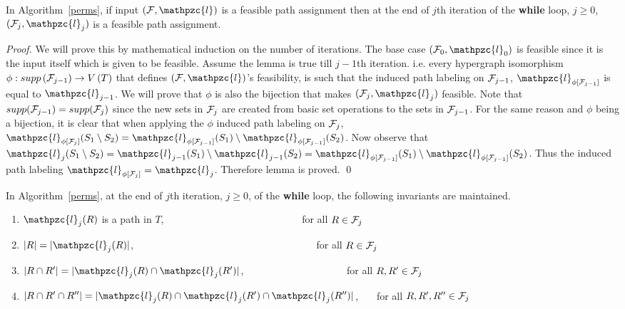 \documentclass[11pt,
               envcountsect,
               envcountsame]
               {../lib/llncs2e/llncs}
\def\cF{{\cal F}}
\def\cl{\mathpzc{l}}
\def\topshrink{0mm} %
\begin{document}
\begin{lemma} 
 \label{lem:feasible} 
 In Algorithm~\ref{perms}, if input $(\cF, \cl)$ is a feasible path
 assignment then at the end of $j$th iteration of the {\bf while}
 loop, $j \ge 0$, $(\cF_j, \cl_j)$ is a feasible path assignment.
\end{lemma}
\begin{proof}%
  We will prove this by mathematical induction on the number of
  iterations. The base case $(\cF_0, \cl_0)$ is feasible since it is
  the input itself which is given to be feasible. Assume the lemma is
  true till $j-1$th iteration. i.e. every hypergraph isomorphism
  $\phi: supp\left(\cF_{j-1}\right) \rightarrow V\left(T \right)$ that
  defines $(\cF, \cl)$'s feasibility, is such that the induced path
  labeling on $\cF_{j-1}$, $\cl_{\phi[{\cF_{j-1}}]}$ is equal to
  $\cl_{j-1}$. We will prove that $\phi$ is also the bijection that
  makes $(\cF_j, \cl_j)$ feasible. Note that $supp(\cF_{j-1}) =
  supp(\cF_{j})$ since the new sets in $\cF_j$ are created from basic
  set operations to the sets in $\cF_{j-1}$. For the same reason and
  $\phi$ being a bijection, it is clear that when applying the $\phi$
  induced path labeling on $\cF_j$, $ \cl_{\phi[{\cF_{j}}]}(S_1
  \setminus S_2) = \cl_{\phi[{\cF_{j-1}}]}(S_1) \setminus
  \cl_{\phi[{\cF_{j-1}}]}(S_2)$. Now observe that $ \cl_j(S_1
  \setminus S_2) = \cl_{j-1}(S_1) \setminus \cl_{j-1}(S_2) =
  \cl_{\phi[{\cF_{j-1}}]}(S_1) \setminus
  \cl_{\phi[{\cF_{j-1}}]}(S_2)$. Thus the induced path labeling
  $\cl_{\phi[{\cF_{j}}]} = \cl_{j}$. Therefore lemma is proved.  \qed
\end{proof}

\begin{lemma}
  \label{lem:invar1} In Algorithm~\ref{perms}, at the end of $j$th
  iteration, $j \ge 0$, of the {\bf while} loop, the following
  invariants are maintained.
  \begin{enumerate}[I {\ }] %
  \item $\cl_j(R)$ is a path in $T$, \ \ \ \ \ \ \ \ \ \ \ \ \ \ \ \ \
    \ \ \ \ \ \ \ \ \ \ for all $R \in \cF_j$%
  \item $|R| = |\cl_j(R)|$, \ \ \ \ \ \ \ \ \ \ \ \ \ \ \ \ \ \ \ \ \
    \ \ \ \ \ \ \ \ \ \ \ \ \ \ \ for all $R \in
    \cF_j$%
  \item $|R \cap R'| = |\cl_j(R) \cap \cl_j(R')|$, \ \ \ \ \ \ \ \ \ \
    \ \ \ \ \ \ \ \ \ \ for all $R, R' \in \cF_j$%
  \item $|R \cap R' \cap R''|=|\cl_j(R) \cap \cl_j(R') \cap
    \cl_j(R'')|$, \ \ \ for all $R, R', R'' \in \cF_j$
  \end{enumerate}
\end{lemma}
\end{document}
